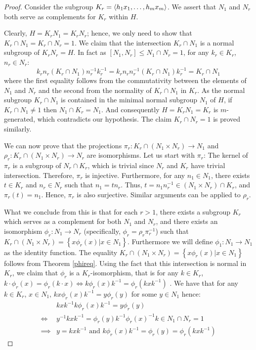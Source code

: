 \begin{proof}
    Consider the subgroup $K_r = \langle h_1x_1,\ldots ,h_mx_m \rangle$. We assert that $N_1$ and $N_r$ both serve as complements for $K_r$ within $H$.
    
    Clearly, $H = K_rN_1 = K_rN_r$; hence, we only need to show that $K_r \cap N_1 = K_r \cap N_r = 1$. We claim that the intersection $K_r \cap N_1$ is a normal subgroup of $K_rN_r = H$. In fact as $[N_1, N_r] \le N_1 \cap N_r = 1$, for any $k_r \in K_r$, $n_r \in N_r$:
    $$ 
    k_rn_r(K_r \cap N_1)n_r^{-1}k_r^{-1} = k_rn_rn_r^{-1}(K_r \cap N_1)k_r^{-1} = K_r \cap N_1 
    $$
    where the first equality follows from the commutativity between the elements of $N_1$ and $N_r$ and the second from the normality of $K_r \cap N_1$ in $K_r$.
    As the normal subgroup $K_r \cap N_1$ is contained in the minimal normal subgroup $N_1$ of $H$, if $K_r \cap N_1 \ne 1$ then $N_1 \cap K_r = N_1$. And consequently $H = K_rN_1 = K_r$ is $m$-generated, which contradicts our hypothesis. The claim $K_r \cap N_r = 1$ is proved similarly.

    We can now prove that the projections $\pi_r : K_r \cap (N_1 \times N_r) \rightarrow N_1$ and $\rho_r : K_r \cap (N_1 \times N_r) \rightarrow N_r$ are isomorphisms. 
    Let us start with $\pi_r$: The kernel of $\pi_r$ is a subgroup of $N_r \cap K_r$, which is trivial since $N_r$ and $K_r$ have trivial intersection. Therefore, $\pi_r$ is injective. 
    Furthermore, for any $n_1 \in N_1$, there exists $t \in K_r$ and $n_r \in N_r$ such that $n_1 = tn_r$. Thus, $t = n_1n_r^{-1} \in (N_1 \times N_r) \cap K_r$, and $\pi_r(t) = n_1$. Hence, $\pi_r$ is also surjective.
    Similar arguments can be applied to $\rho_r$.

    What we conclude from this is that for each $r > 1$, there exists a subgroup $K_r$ which serves as a complement for both $N_1$ and $N_r$, and there exists an isomorphism $\phi_r : N_1 \rightarrow N_r$ (specifically, $\phi_r = \rho_r\pi_r^{-1}$) such that $K_r \cap (N_1 \times N_r) = \left\{x\phi_r(x) | x \in N_1\right\}$. Furthermore we will define $\phi_1 \colon N_1 \rightarrow N_1$ as the identity function.
    The equality $K_r \cap (N_1 \times N_r) = \left\{x\phi_r(x) | x \in N_1\right\}$ follows from Theorem \ref{phireq}.
    Using the fact that this intersection is normal in $K_r$, we claim that $\phi_r$ is a $K_r$-isomorphism, that is for any $k \in K_r$, $k \cdot \phi_r(x) = \phi_r(k \cdot x) \iff k\phi_r(x)k^{-1} = \phi_r(kxk^{-1})$ . We have that for any $k \in K_r$, $x \in N_1$, $kx\phi_r(x)k^{-1} = y\phi_r(y)$ for some $y \in N_1$ hence:
    \begin{align*}
        &kxk^{-1}k\phi_r(x)k^{-1} = y\phi_r(y)\\
        \iff &y^{-1}kxk^{-1} = \phi_r(y)k^{-1}\phi_r(x)^{-1}k \in N_1 \cap N_r = 1\\
        \implies &y = kxk^{-1} \text{ and } k\phi_r(x)k^{-1} = \phi_r(y) = \phi_r(kxk^{-1})
    \end{align*}


\end{proof}
